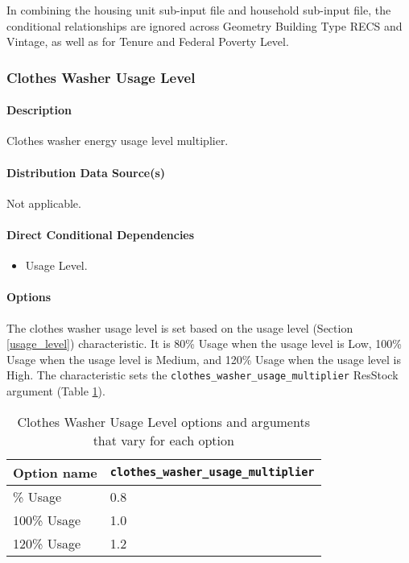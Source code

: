 In combining the housing unit sub-input file and household sub-input file, the conditional relationships are ignored across Geometry Building Type RECS and Vintage, as well as for Tenure and Federal Poverty Level.

\subsubsection{Clothes Washer Usage Level}\label{clothes_washer_usage_level}
\paragraph{Description}
Clothes washer energy usage level multiplier.

\paragraph{Distribution Data Source(s)}
Not applicable.

\paragraph{Direct Conditional Dependencies}
\begin{itemize}
    \item Usage Level.
\end{itemize}

\paragraph{Options}
The clothes washer usage level is set based on the usage level (Section \ref{usage_level}) characteristic. It is 80\% Usage when the usage level is Low, 100\% Usage when the usage level is Medium, and 120\% Usage when the usage level is High. The characteristic sets the \texttt{clothes\_washer\_usage\_multiplier} ResStock argument (Table \ref{table:opt_def_clothes_washer_use}).

\begin{longtable}[]{ |p{2.5cm}|p{6cm}| }
\caption{Clothes Washer Usage Level options and arguments that vary for each option} \label{table:opt_def_clothes_washer_use} \\
\toprule\noalign{}
Option name &
\texttt{clothes\_washer\_usage\_multiplier} \\
\midrule\noalign{}
\endhead
\bottomrule\noalign{}
\endlastfoot
80\% Usage & 0.8 \\
100\% Usage & 1.0 \\
120\% Usage & 1.2 \\
\end{longtable}

